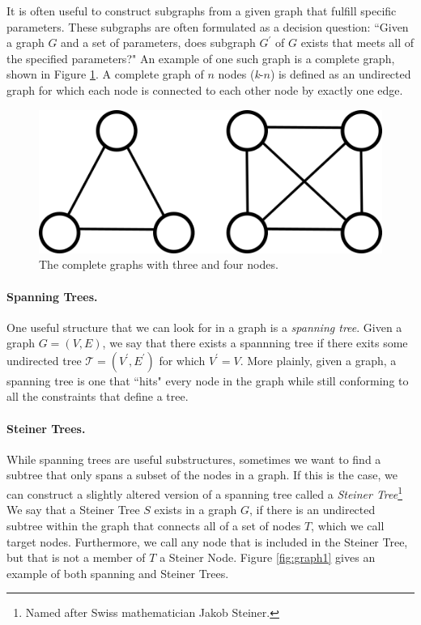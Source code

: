 \documentclass[12pt,twoside]{reedthesis}
\theoremstyle{definition}
\begin{document}
   It is often useful to construct subgraphs from a given graph that fulfill specific parameters. These subgraphs are often formulated as a decision question: ``Given a graph $G$ and a set of parameters, does subgraph $G^\prime$ of $G$ exists that meets all of the specified parameters?" An example of one such graph is a complete graph, shown in Figure \ref{fig:complete_graphs}. A complete graph of $n$ nodes (\textit{k}-$n$) is defined as an undirected graph for which each node is connected to each other node by exactly one edge.

   \begin{figure}[!h]
     \begin{center}
       \includegraphics[width=\textwidth/2]{complete_graphs}
     \caption[Complete Graphs \textit{k}-3 and \textit{k}-4.]{The complete graphs with three and four nodes.}
     \label{fig:complete_graphs}
     \end{center}
   \end{figure}

   \paragraph{Spanning Trees.}One useful structure that we can look for in a graph is a \textit{spanning tree}. Given a graph $G=(V,E)$, we say that there exists a spannning tree if there exits some undirected tree $\mathcal{T}=(V^\prime,E^\prime)$ for which $V^\prime = V$.  More plainly, given a graph, a spanning tree is one that ``hits" every node in the graph while still conforming to all the constraints that define a tree.

   \paragraph{Steiner Trees.}While spanning trees are useful substructures, sometimes we want to find a subtree that only spans a subset of the nodes in a graph. If this is the case, we can construct a slightly altered version of a spanning tree called a \textit{Steiner Tree}\footnote{Named after Swiss mathematician Jakob Steiner.} We say that a Steiner Tree $S$ exists in a graph $G$, if there is an undirected subtree within the graph that connects all of a set of nodes $T$, which we call target nodes. Furthermore, we call any node that is included in the Steiner Tree, but that is not a member of $T$ a Steiner Node. Figure \ref{fig:graph1} gives an example of both spanning and Steiner Trees.
\end{document}
